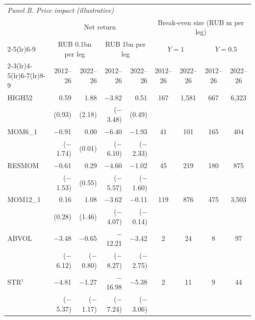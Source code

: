 \begin{tabular}{l rr rr cc cc}
\toprule
\multicolumn{9}{l}{\emph{Panel B. Price impact (illustrative)}} \\
 & \multicolumn{4}{c}{Net return} & \multicolumn{4}{c}{Break-even size (RUB m per leg)} \\
\cmidrule(lr){2-5}\cmidrule(lr){6-9}
 & \multicolumn{2}{c}{RUB 0.1bn per leg} & \multicolumn{2}{c}{RUB 1bn per leg} & \multicolumn{2}{c}{$Y=1$} & \multicolumn{2}{c}{$Y=0.5$} \\
\cmidrule(lr){2-3}\cmidrule(lr){4-5}\cmidrule(lr){6-7}\cmidrule(lr){8-9}
 & 2012--26 & 2022--26 & 2012--26 & 2022--26 & 2012--26 & 2022--26 & 2012--26 & 2022--26 \\
\midrule
HIGH52 & 0.59 & 1.88 & $-$3.82 & 0.51 & 167 & 1{,}581 & 667 & 6{,}323 \\
 & (0.93) & (2.18) & ($-$3.48) & (0.49) & & & & \\[1pt]
MOM6\_1 & $-$0.91 & 0.00 & $-$6.40 & $-$1.93 & 41 & 101 & 165 & 404 \\
 & ($-$1.74) & (0.01) & ($-$6.10) & ($-$2.33) & & & & \\[1pt]
RESMOM & $-$0.61 & 0.29 & $-$4.60 & $-$1.02 & 45 & 219 & 180 & 875 \\
 & ($-$1.53) & (0.55) & ($-$5.57) & ($-$1.60) & & & & \\[1pt]
MOM12\_1 & 0.16 & 1.08 & $-$3.62 & $-$0.11 & 119 & 876 & 475 & 3{,}503 \\
 & (0.28) & (1.46) & ($-$4.07) & ($-$0.14) & & & & \\[1pt]
ABVOL & $-$3.48 & $-$0.65 & $-$12.21 & $-$3.42 & 2 & 24 & 8 & 97 \\
 & ($-$6.12) & ($-$0.80) & ($-$8.27) & ($-$2.75) & & & & \\[1pt]
STR$^{\dagger}$ & $-$4.81 & $-$1.27 & $-$16.98 & $-$5.38 & 2 & 11 & 9 & 44 \\
 & ($-$5.37) & ($-$1.17) & ($-$7.24) & ($-$3.06) & & & & \\[1pt]
\bottomrule
\end{tabular}